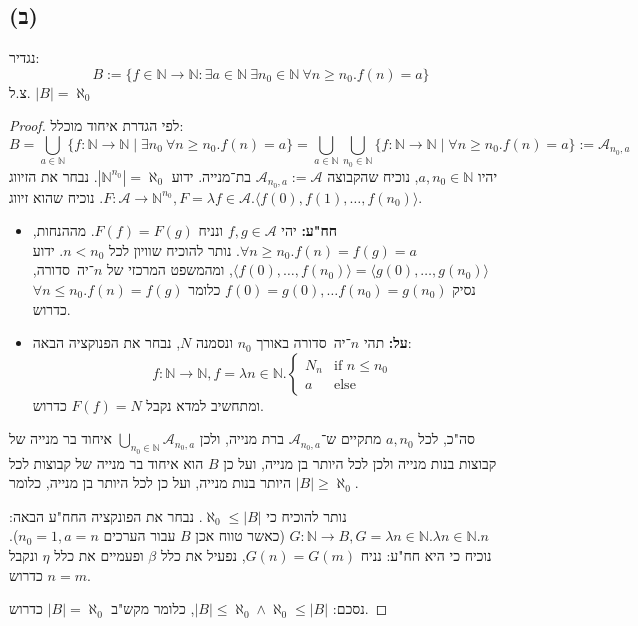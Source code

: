\documentclass[]{article}
\newcommand\N     {\mathbb{N}}
\newcommand\ac    {\mathcal{A}}
\newcommand\case  {\text{if }}
\newcommand\other {\text{else}}
\newcommand\ra    {\rangle}
\newcommand\la    {\langle}
\newcommand\az    {\aleph_0}
\newcommand\n     {$n$־יה\ }
\begin{document}
	\subsection*{(ב)}
נגדיר:
	\[ B := \{ f \in \N \to \N \colon \exists a \in \N \ \exists n_0 \in \N \ \forall n \ge n_0. f(n) = a\} \]
	צ.ל. $ |B| = \az $
	\begin{proof}
		לפי הגדרת איחוד מוכלל: 
			\[ B = \bigcup_{a \in \N} \{f \colon \N \to \N \mid \exists n_0 \ \forall n \ge n_0. f(n) = a\} = \bigcup_{a \in \N} \bigcup_{n_0 \in \N} \{f \colon \N \to \N \mid \forall n \ge n_0. f(n) = a\} := \ac_{n_0, a}\]
		יהיו $ a, n_0 \in \N $, נוכיח שהקבוצה $ \ac_{n_0, a} := \ac$ בת־מנייה. ידוע $ |\N^{n_0}| = \az $. נבחר את הזיווג $ F \colon \ac \to \N^{n_0}, F = \lambda f \in \ac. \la f(0), f(1), \dots, f(n_0) \ra $. נוכיח שהוא זיווג. 
		\begin{itemize}
			\item \textbf{חח"ע: }יהי $ f, g \in \ac $ ונניח $ F(f) = F(g) $. מההנחות, $ \forall n \ge n_0. f(n) = f(g) = a $. נותר להוכיח שוויון לכל $ n < n_0 $. ידוע $ \la f(0), \dots, f(n_0) \ra = \la g(0), \dots, g(n_0) \ra $, ומהמשפט המרכזי של \n סדורה, נסיק $ f(0) = g(0), \dots f(n_0) = g(n_0) $ כלומר $ \forall n \le n_0. f(n) = f(g) $ כדרוש. 
			\item \textbf{על: }תהי \n סדורה באורך $ n_0 $ ונסמנה $ N $, נבחר את הפנוקציה הבאה: 
			\[ f \colon \N \to \N, f = \lambda n \in \N. \begin{cases}
				N_n &\case n \le n_0 \\
				a &\other
			\end{cases} \]
				ומתחשיב למדא נקבל $ F(f) = N $ כדרוש. 
		\end{itemize}
	סה"כ, לכל $ a, n_0 $ מתקיים ש־$ \ac_{n_0, a} $ ברת מנייה, ולכן $ \bigcup_{n_0 \in \N} \ac_{n_0, a} $ איחוד בר מנייה של קבוצות בנות מנייה ולכן לכל היותר בן מנייה, ועל כן $ B $ הוא איחוד בר מנייה של קבוצות לכל היותר בנות מנייה, ועל כן לכל היותר בן מנייה, כלומר $ |B| \ge \az $. 
	
	נותר להוכיח כי $ \az \le |B| $. נבחר את הפונקציה החח"ע הבאה: $ G \colon \N \to B, G = \lambda n \in \N. \lambda n \in \N. n $ (כאשר טווח אכן $ B $ עבור הערכים $ n_0 = 1, a = n $). נוכיח כי היא חח"ע: נניח $ G(n) = G(m) $, נפעיל את כלל $ \beta $ ופעמיים את כלל $ \eta $ ונקבל $ n = m $ כדרוש.  
	
	נסכם: $ |B| \le \az \land \az \le |B| $, כלומר מקש"ב $ |B| = \az $ כדרוש. 
	\end{proof}
	
\end{document}
